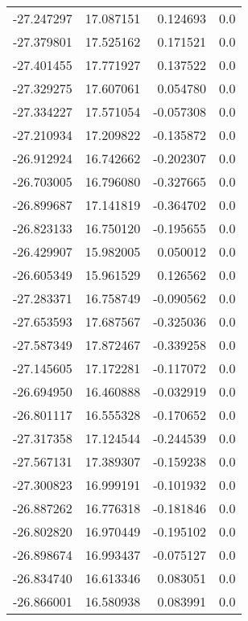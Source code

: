 \begin{tabular}{rrrr}
      -27.247297 &        17.087151 &    0.124693 &   0.0 \\
      -27.379801 &        17.525162 &    0.171521 &   0.0 \\
      -27.401455 &        17.771927 &    0.137522 &   0.0 \\
      -27.329275 &        17.607061 &    0.054780 &   0.0 \\
      -27.334227 &        17.571054 &   -0.057308 &   0.0 \\
      -27.210934 &        17.209822 &   -0.135872 &   0.0 \\
      -26.912924 &        16.742662 &   -0.202307 &   0.0 \\
      -26.703005 &        16.796080 &   -0.327665 &   0.0 \\
      -26.899687 &        17.141819 &   -0.364702 &   0.0 \\
      -26.823133 &        16.750120 &   -0.195655 &   0.0 \\
      -26.429907 &        15.982005 &    0.050012 &   0.0 \\
      -26.605349 &        15.961529 &    0.126562 &   0.0 \\
      -27.283371 &        16.758749 &   -0.090562 &   0.0 \\
      -27.653593 &        17.687567 &   -0.325036 &   0.0 \\
      -27.587349 &        17.872467 &   -0.339258 &   0.0 \\
      -27.145605 &        17.172281 &   -0.117072 &   0.0 \\
      -26.694950 &        16.460888 &   -0.032919 &   0.0 \\
      -26.801117 &        16.555328 &   -0.170652 &   0.0 \\
      -27.317358 &        17.124544 &   -0.244539 &   0.0 \\
      -27.567131 &        17.389307 &   -0.159238 &   0.0 \\
      -27.300823 &        16.999191 &   -0.101932 &   0.0 \\
      -26.887262 &        16.776318 &   -0.181846 &   0.0 \\
      -26.802820 &        16.970449 &   -0.195102 &   0.0 \\
      -26.898674 &        16.993437 &   -0.075127 &   0.0 \\
      -26.834740 &        16.613346 &    0.083051 &   0.0 \\
      -26.866001 &        16.580938 &    0.083991 &   0.0 \\

\end{tabular}
